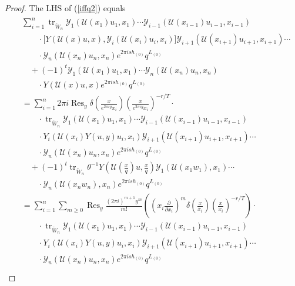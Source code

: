 \documentclass[10pt,a4paper]{amsart}
\newcommand{\Y}{\mathcal{Y}}
\begin{document}
\begin{proof}
The LHS of (\ref{iffq2}) equals
\begin{align}\label{iffq3}
\begin{split}
&\sum_{i=1}^{n} \operatorname{tr}_{\tilde{W}_n}
\Y_1(\mathcal{U}(x_{1})u_{1},x_{1}) \cdots \Y_{i-1}(\mathcal{U}(x_{i-1})u_{i-1},x_{i-1}) \\
&\qquad \cdot \big[Y(\mathcal{U}(x)u,x),\Y_i(\mathcal{U}(x_{i})u_{i},x_{i})\big]
\Y_{i+1}(\mathcal{U}(x_{i+1})u_{i+1},x_{i+1}) \cdots \\
&\qquad \cdot \Y_n(\mathcal{U}(x_{n})u_{n},x_{n}) e^{2\pi i s h_{(0)}} q^{L_{(0)}} \\
&\quad + (-1)^{t}
\Y_1(\mathcal{U}(x_{1})u_{1},x_{1}) \cdots \Y_n(\mathcal{U}(x_{n})u_{n},x_{n}) \\
&\qquad \cdot Y(\mathcal{U}(x)u,x) e^{2\pi i s h_{(0)}} q^{L_{(0)}} \\
&=\sum_{i=1}^{n} 2\pi i \operatorname{Res}_{y}
\delta\left(\frac{x}{e^{2\pi i y} x_i}\right)
\left(\frac{x}{e^{2\pi i y} x_i}\right)^{-r/T} \cdot \\
&\qquad \cdot \operatorname{tr}_{\tilde{W}_n}
\Y_1(\mathcal{U}(x_{1})u_{1},x_{1}) \cdots
\Y_{i-1}(\mathcal{U}(x_{i-1})u_{i-1},x_{i-1}) \\
&\qquad \cdot Y_i\left(\mathcal{U}(x_i) Y(u,y) u_i, x_i \right)
\Y_{i+1}(\mathcal{U}(x_{i+1})u_{i+1},x_{i+1}) \cdots \\
&\qquad \cdot \Y_n(\mathcal{U}(x_{n})u_{n},x_{n})
e^{2\pi i s h_{(0)}} q^{L_{(0)}} \\
&\quad + (-1)^{t}
\operatorname{tr}_{\tilde{W}_n} \theta^{-1} Y\left(\mathcal{U}\left(\frac{x}{q}\right) u, \frac{x}{q} \right)
\mathcal{Y}_1(\mathcal{U}(x_1 w_1),x_1) \cdots \\
&\qquad \cdot \mathcal{Y}_n(\mathcal{U}(x_n w_n),x_n)
e^{2\pi i s h_{(0)}} q^{L_{(0)}} \\
&=\sum_{i=1}^{n} \sum_{m \geq 0}
\operatorname{Res}_{y} \frac{(2\pi i)^{m+1} y^m}{m!}
\left( \left( x_i \frac{\partial}{\partial x_i} \right)^m
\delta\left( \frac{x}{x_i} \right)
\left( \frac{x}{x_i} \right)^{-r/T} \right) \cdot \\
&\qquad \cdot \operatorname{tr}_{\tilde{W}_n}
\Y_1(\mathcal{U}(x_{1})u_{1},x_{1}) \cdots
\Y_{i-1}(\mathcal{U}(x_{i-1})u_{i-1},x_{i-1}) \\
&\qquad \cdot Y_i(\mathcal{U}(x_i) Y(u,y) u_i, x_i)
\Y_{i+1}(\mathcal{U}(x_{i+1})u_{i+1},x_{i+1}) \cdots \\
&\qquad \cdot \Y_n(\mathcal{U}(x_{n})u_{n},x_{n})
e^{2\pi i s h_{(0)}} q^{L_{(0)}} \\

\end{split}
\end{align}
\end{proof}
\end{document}
